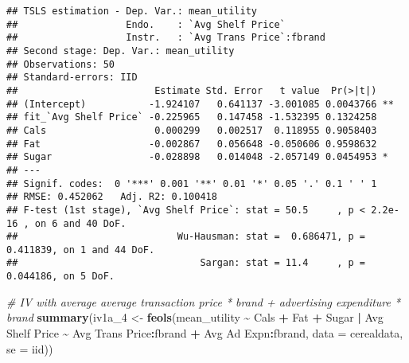 \documentclass[
]{article}
\newenvironment{Shaded}{\begin{snugshade}}{\end{snugshade}}
\newcommand{\AttributeTok}[1]{\textcolor[rgb]{0.13,0.29,0.53}{#1}}
\newcommand{\CommentTok}[1]{\textcolor[rgb]{0.56,0.35,0.01}{\textit{#1}}}
\newcommand{\FunctionTok}[1]{\textcolor[rgb]{0.13,0.29,0.53}{\textbf{#1}}}
\newcommand{\NormalTok}[1]{#1}
\newcommand{\OtherTok}[1]{\textcolor[rgb]{0.56,0.35,0.01}{#1}}
\newcommand{\SpecialCharTok}[1]{\textcolor[rgb]{0.81,0.36,0.00}{\textbf{#1}}}
\newcommand{\StringTok}[1]{\textcolor[rgb]{0.31,0.60,0.02}{#1}}
\begin{document}
\begin{verbatim}
## TSLS estimation - Dep. Var.: mean_utility
##                   Endo.    : `Avg Shelf Price`
##                   Instr.   : `Avg Trans Price`:fbrand
## Second stage: Dep. Var.: mean_utility
## Observations: 50
## Standard-errors: IID 
##                        Estimate Std. Error   t value  Pr(>|t|)    
## (Intercept)           -1.924107   0.641137 -3.001085 0.0043766 ** 
## fit_`Avg Shelf Price` -0.225965   0.147458 -1.532395 0.1324258    
## Cals                   0.000299   0.002517  0.118955 0.9058403    
## Fat                   -0.002867   0.056648 -0.050606 0.9598632    
## Sugar                 -0.028898   0.014048 -2.057149 0.0454953 *  
## ---
## Signif. codes:  0 '***' 0.001 '**' 0.01 '*' 0.05 '.' 0.1 ' ' 1
## RMSE: 0.452062   Adj. R2: 0.100418
## F-test (1st stage), `Avg Shelf Price`: stat = 50.5     , p < 2.2e-16 , on 6 and 40 DoF.
##                            Wu-Hausman: stat =  0.686471, p = 0.411839, on 1 and 44 DoF.
##                                Sargan: stat = 11.4     , p = 0.044186, on 5 DoF.
\end{verbatim}

\begin{Shaded}
\begin{Highlighting}[]
\CommentTok{\#  IV with average average transaction price * brand + advertising expenditure * brand}
\FunctionTok{summary}\NormalTok{(iv1a\_4 }\OtherTok{\textless{}{-}} \FunctionTok{feols}\NormalTok{(mean\_utility }\SpecialCharTok{\textasciitilde{}}\NormalTok{ Cals }\SpecialCharTok{+}\NormalTok{ Fat }\SpecialCharTok{+}\NormalTok{ Sugar }\SpecialCharTok{|} \StringTok{\textasciigrave{}}\AttributeTok{Avg Shelf Price}\StringTok{\textasciigrave{}} \SpecialCharTok{\textasciitilde{}} \StringTok{\textasciigrave{}}\AttributeTok{Avg Trans Price}\StringTok{\textasciigrave{}}\SpecialCharTok{:}\NormalTok{fbrand }\SpecialCharTok{+} \StringTok{\textasciigrave{}}\AttributeTok{Avg Ad Expn}\StringTok{\textasciigrave{}}\SpecialCharTok{:}\NormalTok{fbrand, }\AttributeTok{data =}\NormalTok{ cerealdata, }\AttributeTok{se =} \StringTok{\textquotesingle{}iid\textquotesingle{}}\NormalTok{))}
\end{Highlighting}
\end{Shaded}
\end{document}
